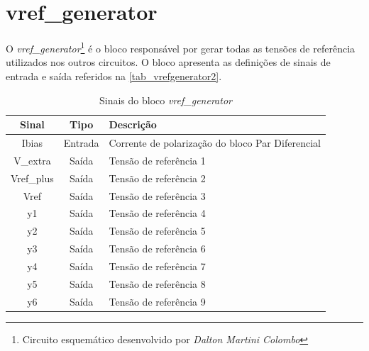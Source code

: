 \renewcommand{\NomeBloco}{\textit{vref\_generator}}
\renewcommand{\NomeBlocoNoUnderline}{vrefgenerator}
\renewcommand{\NomePTab}{tab_\NomeBlocoNoUnderline}
\renewcommand{\NomeSTab}{tab_\NomeBlocoNoUnderline2}
\renewcommand{\NomePFig}{fig_\NomeBlocoNoUnderline}
\renewcommand{\NomeSFig}{fig_\NomeBlocoNoUnderline2}
\renewcommand{\NomeTTab}{tab_\NomeBlocoNoUnderline3}
\renewcommand{\NomeQTab}{tab_\NomeBlocoNoUnderline4}

\section{vref\_generator}

O \textit{\NomeBloco}\footnote{Circuito esquemático desenvolvido por \textit{Dalton Martini Colombo}} \'e o bloco respons\'avel por gerar todas as tensões de refer\^encia utilizados nos outros circuitos. O bloco apresenta as definições de sinais de entrada e sa\'ida referidos na \autoref{\NomeSTab}.

\begin{table}[!h]
\caption{Sinais do bloco \NomeBloco}
\label{\NomeSTab}
\centering
\begin{tabular}{ccl}

    \toprule
    Sinal & Tipo    & Descrição      \\
    \midrule \midrule
    Ibias   & Entrada   & Corrente de polarização do bloco Par Diferencial \\
    \midrule
    V\_extra   & Saída   & Tensão de refer\^encia 1 \\
    \midrule
    Vref\_plus   & Saída   & Tensão de refer\^encia 2 \\
    \midrule
    Vref   & Saída   & Tensão de refer\^encia 3 \\
    \midrule
    y1   & Saída   & Tensão de refer\^encia 4 \\
    \midrule
    y2   & Saída   & Tensão de refer\^encia 5 \\
    \midrule
    y3   & Saída   & Tensão de refer\^encia 6 \\
    \midrule
    y4  & Saída   & Tensão de refer\^encia 7 \\
    \midrule
    y5   & Saída   & Tensão de refer\^encia 8 \\
    \midrule
    y6   & Saída   & Tensão de refer\^encia 9 \\
    \bottomrule
\end{tabular}
\end{table}

